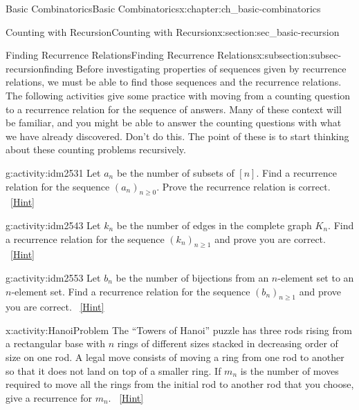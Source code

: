 \documentclass[oneside,10pt,]{book}
\numberwithin{equation}{chapter}
\begin{document}
\begin{chapterptx}{Basic Combinatorics}{}{Basic Combinatorics}{}{}{x:chapter:ch_basic-combinatorics}
\begin{sectionptx}{Counting with Recursion}{}{Counting with Recursion}{}{}{x:section:sec_basic-recursion}
\begin{introduction}{}
\end{introduction}%
%
%
\typeout{************************************************}
\typeout{************************************************}
%
\begin{subsectionptx}{Finding Recurrence Relations}{}{Finding Recurrence Relations}{}{}{x:subsection:subsec-recursionfinding}
Before investigating properties of sequences given by recurrence relations, we must be able to find those sequences and the recurrence relations.  The following activities give some practice with moving from a counting question to a recurrence relation for the sequence of answers.  Many of these context will be familiar, and you might be able to answer the counting questions with what we have already discovered.  Don't do this.  The point of these is to start thinking about these counting problems recursively.%
\begin{activity}{}{g:activity:idm2531}%
Let \(a_n\) be the number of subsets of \([n]\).  Find a recurrence relation for the sequence \((a_n)_{n \ge 0}\).  Prove the recurrence relation is correct.%
\qquad~\hfill{\tiny\hyperlink{g:hint:idm2537-back}{[Hint]}}\end{activity}
\begin{activity}{}{g:activity:idm2543}%
Let \(k_n\) be the number of edges in the complete graph \(K_n\).  Find a recurrence relation for the sequence \((k_n)_{n \ge 1}\) and prove you are correct.%
\qquad~\hfill{\tiny\hyperlink{g:hint:idm2549-back}{[Hint]}}\end{activity}
\begin{activity}{}{g:activity:idm2553}%
Let \(b_n\) be the number of bijections from an \(n\)-element set to an \(n\)-element set.  Find a recurrence relation for the sequence \((b_n)_{n \ge 1}\) and prove you are correct.%
\qquad~\hfill{\tiny\hyperlink{g:hint:idm2560-back}{[Hint]}}\end{activity}
\begin{activity}{}{x:activity:HanoiProblem}%
The ``Towers of Hanoi'' puzzle has three rods rising from a rectangular base with \(n\) rings of different sizes stacked in decreasing order of size on one rod. A legal move consists of moving a ring from one rod to another so that it does not land on top of a smaller ring. If \(m_n\) is the number of moves required to move all the rings from the initial rod to another rod that you choose, give a recurrence for \(m_n\).%
\qquad~\hfill{\tiny\hyperlink{g:hint:idm2571-back}{[Hint]}}\end{activity}

\end{subsectionptx}
\end{sectionptx}
\end{chapterptx}
\end{document}
